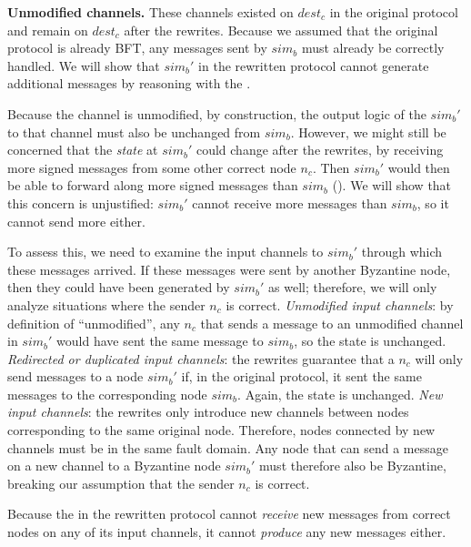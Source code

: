 \textbf{Unmodified channels.}
These channels existed on $dest_c$ in the original protocol and remain on $dest_c$ after the rewrites.
Because we assumed that the original protocol is already BFT, any messages sent by $sim_b$ must already be correctly handled.
We will show that $sim_b'$ in the rewritten protocol cannot generate additional messages by reasoning with the \randomSimulator{}.

Because the channel is unmodified, by construction, the output logic of the $sim_b'$ to that channel must also be unchanged from $sim_b$.
However, we might still be concerned that the \emph{state} at $sim_b'$ could change after the rewrites, by receiving more signed messages from some other correct node $n_c$.
Then $sim_b'$ would then be able to forward along more signed messages than $sim_b$ ().
We will show that this concern is unjustified: $sim_b'$ cannot receive more messages than $sim_b$, so it cannot send more either.

To assess this, we need to examine the input channels to $sim_b'$ through which these messages arrived.
If these messages were sent by another Byzantine node, then they could have been generated by $sim_b'$ as well; therefore, we will only analyze situations where the sender $n_c$ is correct.
\textit{Unmodified input channels}: by definition of ``unmodified'', any $n_c$ that sends a message to an unmodified channel in $sim_b'$ would have sent the same message to $sim_b$, so the state is unchanged.
\textit{Redirected or duplicated input channels}: the rewrites guarantee that a $n_c$ will only send messages to a node $sim_b'$ if, in the original protocol, it sent the same messages to the corresponding node $sim_b$. Again, the state is unchanged.
\textit{New input channels}: the rewrites only introduce new channels between nodes corresponding to the same original node.
Therefore, nodes connected by new channels must be in the same fault domain.
Any node that can send a message on a new channel to a Byzantine node $sim_b'$ must therefore also be Byzantine, breaking our assumption that the sender $n_c$ is correct.

Because the \randomSimulator{} in the rewritten protocol cannot \emph{receive} new messages from correct nodes on any of its input channels, it cannot \emph{produce} any new messages either.

